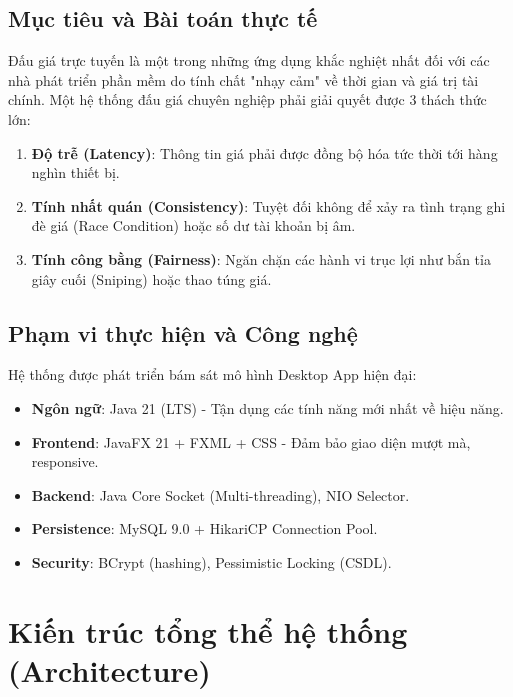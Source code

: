 \documentclass[12pt,a4paper]{article}
\begin{document}
\subsection{Mục tiêu và Bài toán thực tế}
Đấu giá trực tuyến là một trong những ứng dụng khắc nghiệt nhất đối với các nhà phát triển phần mềm do tính chất "nhạy cảm" về thời gian và giá trị tài chính. Một hệ thống đấu giá chuyên nghiệp phải giải quyết được 3 thách thức lớn:
\begin{enumerate}[label=\alph*)]
    \item \textbf{Độ trễ (Latency)}: Thông tin giá phải được đồng bộ hóa tức thời tới hàng nghìn thiết bị.
    \item \textbf{Tính nhất quán (Consistency)}: Tuyệt đối không để xảy ra tình trạng ghi đè giá (Race Condition) hoặc số dư tài khoản bị âm.
    \item \textbf{Tính công bằng (Fairness)}: Ngăn chặn các hành vi trục lợi như bắn tỉa giây cuối (Sniping) hoặc thao túng giá.
\end{enumerate}

\subsection{Phạm vi thực hiện và Công nghệ}
Hệ thống được phát triển bám sát mô hình Desktop App hiện đại:
\begin{itemize}
    \item \textbf{Ngôn ngữ}: Java 21 (LTS) - Tận dụng các tính năng mới nhất về hiệu năng.
    \item \textbf{Frontend}: JavaFX 21 + FXML + CSS - Đảm bảo giao diện mượt mà, responsive.
    \item \textbf{Backend}: Java Core Socket (Multi-threading), NIO Selector.
    \item \textbf{Persistence}: MySQL 9.0 + HikariCP Connection Pool.
    \item \textbf{Security}: BCrypt (hashing), Pessimistic Locking (CSDL).
\end{itemize}

\section{Kiến trúc tổng thể hệ thống (Architecture)}
\end{document}
